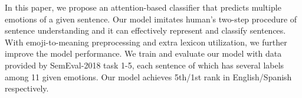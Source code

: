 In this paper, we propose an attention-based classifier that predicts multiple emotions of a given sentence. Our model imitates human's two-step procedure of sentence understanding and it can effectively represent and classify sentences. With emoji-to-meaning preprocessing and extra lexicon utilization, we further improve the model performance. We train and evaluate our model with data provided by SemEval-2018 task 1-5, each sentence of which has several labels among 11 given emotions. Our model achieves 5th/1st rank in English/Spanish respectively.
